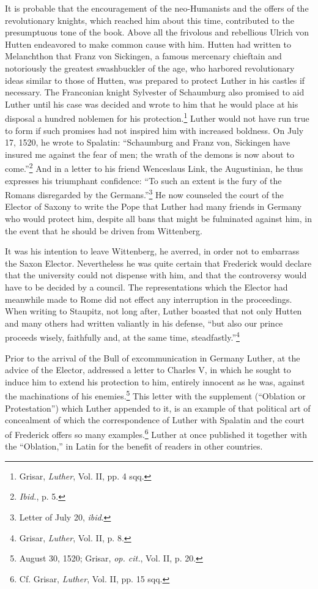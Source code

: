 It is probable that the encouragement of the neo-Humanists and
the offers of the revolutionary knights, which reached him about this
time, contributed to the presumptuous tone of the book. Above
all the frivolous and rebellious Ulrich von Hutten endeavored to
make common cause with him. Hutten had written to Melanchthon
that Franz von Sickingen, a famous mercenary chieftain and notoriously
the greatest swashbuckler of the age, who harbored revolutionary
ideas similar to those of Hutten, was prepared to protect
Luther in his castles if necessary. The Franconian knight Sylvester of
Schaumburg also promised to aid Luther until his case was decided
and wrote to him that he would place at his disposal a hundred
noblemen for his protection.\footnote{Grisar, \textit{Luther}, Vol. II, pp. 4 sqq.}
Luther would not have run true to
form if such promises had not inspired him with increased boldness.
On July 17, 1520, he wrote to Spalatin: “Schaumburg and Franz
von, Sickingen have insured me against the fear of men; the wrath of
the demons is now about to come.”\footnote{\textit{Ibid.}, p. 5.}
And in a letter to his friend
Wenceslaus Link, the Augustinian, he thus expresses his triumphant
confidence: “To such an extent is the fury of the Romans disregarded by
the Germans.”\footnote{Letter of July 20, \textit{ibid}.}
He now counseled the court of the Elector
of Saxony to write the Pope that Luther had many friends in
Germany who would protect him, despite all bans that might be fulminated
against him, in the event that he should be driven from Wittenberg.

It was his intention to leave Wittenberg, he averred, in order not
to embarrass the Saxon Elector. Nevertheless he was quite certain
that Frederick would declare that the university could not dispense with
him, and that the controversy would have to be decided
by a council. The representations which the Elector had meanwhile
made to Rome did not effect any interruption in the proceedings.
When writing to Staupitz, not long after, Luther boasted that not
only Hutten and many others had written valiantly in his defense,
“but also our prince proceeds wisely, faithfully and, at the same time,
steadfastly.”\footnote{Grisar, \textit{Luther}, Vol. II, p. 8.}

Prior to the arrival of the Bull of excommunication in Germany
Luther, at the advice of the Elector, addressed a letter to Charles V,
in which he sought to induce him to extend his protection to him,
entirely innocent as he was, against the machinations of his enemies.\footnote
{August 30, 1520; Grisar, \textit{op. cit.}, Vol. II, p. 20.}
This letter with the supplement (“Oblation or Protestation”) which
Luther appended to it, is an example of that political art of concealment
of which the correspondence of Luther with Spalatin and the
court of Frederick offers so many examples.\footnote
{Cf. Grisar, \textit{Luther}, Vol. II, pp. 15 sqq.}
Luther at once published
it together with the “Oblation,” in Latin for the benefit of
readers in other countries.

